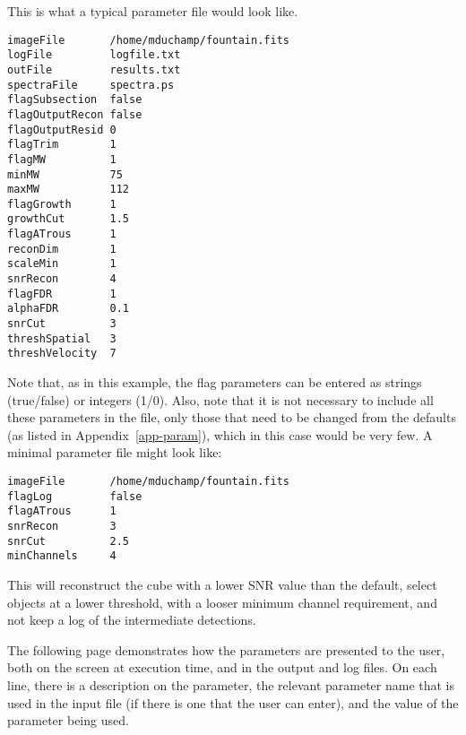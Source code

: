 \label{app-input}

This is what a typical parameter file would look like.

\begin{verbatim}
imageFile       /home/mduchamp/fountain.fits
logFile         logfile.txt
outFile         results.txt
spectraFile     spectra.ps
flagSubsection  false
flagOutputRecon false
flagOutputResid 0
flagTrim        1
flagMW          1
minMW           75
maxMW           112
flagGrowth      1
growthCut       1.5
flagATrous      1
reconDim        1          
scaleMin        1
snrRecon        4
flagFDR         1
alphaFDR        0.1
snrCut          3
threshSpatial   3
threshVelocity  7
\end{verbatim}

Note that, as in this example, the flag parameters can be entered as
strings (true/false) or integers (1/0). Also, note that it is not
necessary to include all these parameters in the file, only those that
need to be changed from the defaults (as listed in
Appendix~\ref{app-param}), which in this case would be very few. A
minimal parameter file might look like:
\begin{verbatim}
imageFile       /home/mduchamp/fountain.fits
flagLog         false
flagATrous      1
snrRecon        3
snrCut          2.5
minChannels     4
\end{verbatim}
This will reconstruct the cube with a lower SNR value than the
default, select objects at a lower threshold,  with a looser minimum
channel requirement, and not keep a log of the intermediate
detections. 

The following page demonstrates how the parameters are presented to
the user, both on the screen at execution time, and in the output and
log files. On each line, there is a description on the parameter, the
relevant parameter name that is used in the input file (if there is
one that the user can enter), and the value of the parameter being
used.

